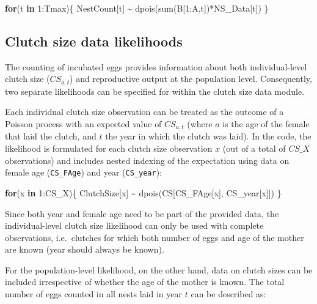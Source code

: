 \documentclass[
]{book}
\newenvironment{Shaded}{\begin{snugshade}}{\end{snugshade}}
\newcommand{\ControlFlowTok}[1]{\textcolor[rgb]{0.13,0.29,0.53}{\textbf{#1}}}
\newcommand{\DecValTok}[1]{\textcolor[rgb]{0.00,0.00,0.81}{#1}}
\newcommand{\FunctionTok}[1]{\textcolor[rgb]{0.00,0.00,0.00}{#1}}
\newcommand{\NormalTok}[1]{#1}
\newcommand{\SpecialCharTok}[1]{\textcolor[rgb]{0.00,0.00,0.00}{#1}}
\begin{document}
\begin{Shaded}
\begin{Highlighting}[]
\ControlFlowTok{for}\NormalTok{(t }\ControlFlowTok{in} \DecValTok{1}\SpecialCharTok{:}\NormalTok{Tmax)\{}
\NormalTok{  NestCount[t] }\SpecialCharTok{\textasciitilde{}} \FunctionTok{dpois}\NormalTok{(}\FunctionTok{sum}\NormalTok{(B[}\DecValTok{1}\SpecialCharTok{:}\NormalTok{A,t])}\SpecialCharTok{*}\NormalTok{NS\_Data[t])}
\NormalTok{\}}
\end{Highlighting}
\end{Shaded}

\hypertarget{clutch-size-data-likelihoods}{%
\subsection{Clutch size data likelihoods}\label{clutch-size-data-likelihoods}}

The counting of incubated eggs provides information about both individual-level
clutch size (\(CS_{a,t}\)) and reproductive output at the population level.
Consequently, two separate likelihoods can be specified for within the clutch
size data module.

Each individual clutch size observation can be treated as the outcome of a
Poisson process with an expected value of \(CS_{a,t}\) (where \(a\) is the age of
the female that laid the clutch, and \(t\) the year in which the clutch was laid).
In the code, the likelihood is formulated for each clutch size observation \(x\)
(out of a total of \(CS\_X\) observations) and includes nested indexing of the
expectation using data on female age (\texttt{CS\_FAge}) and year (\texttt{CS\_year}):

\begin{Shaded}
\begin{Highlighting}[]
\ControlFlowTok{for}\NormalTok{(x }\ControlFlowTok{in} \DecValTok{1}\SpecialCharTok{:}\NormalTok{CS\_X)\{}
\NormalTok{    ClutchSize[x] }\SpecialCharTok{\textasciitilde{}} \FunctionTok{dpois}\NormalTok{(CS[CS\_FAge[x], CS\_year[x]])}
\NormalTok{\}}
\end{Highlighting}
\end{Shaded}

Since both year and female age need to be part of the provided data, the
individual-level clutch size likelihood can only be used with complete
observations, i.e.~clutches for which both number of eggs and age of the mother
are known (year should always be known).

For the population-level likelihood, on the other hand, data on clutch sizes can
be included irrespective of whether the age of the mother is known. The total
number of eggs counted in all nests laid in year \(t\) can be described as:
\end{document}
